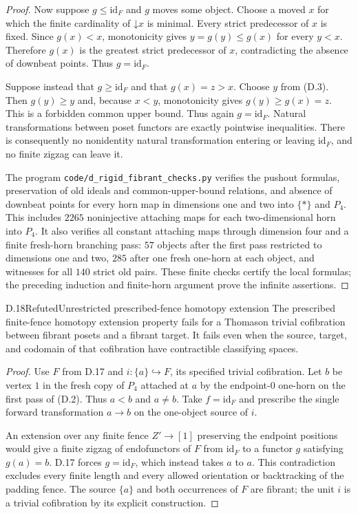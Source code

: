 \begin{proof}
Now suppose $g\le\mathrm{id}_F$ and $g$ moves some object. Choose a moved $x$ for which the finite cardinality of $\mathord\downarrow x$ is minimal. Every strict predecessor of $x$ is fixed. Since $g(x)<x$, monotonicity gives
$y=g(y)\le g(x)$ for every $y<x$. Therefore $g(x)$ is the greatest strict predecessor of $x$, contradicting the absence of downbeat points. Thus $g=\mathrm{id}_F$.

Suppose instead that $g\ge\mathrm{id}_F$ and that $g(x)=z>x$. Choose $y$ from (D.3). Then $g(y)\ge y$ and, because $x<y$, monotonicity gives $g(y)\ge g(x)=z$. This is a forbidden common upper bound. Thus again $g=\mathrm{id}_F$. Natural transformations between poset functors are exactly pointwise inequalities. There is consequently no nonidentity natural transformation entering or leaving $\mathrm{id}_F$, and no finite zigzag can leave it.

The program \texttt{code/d\_rigid\_fibrant\_checks.py} verifies the pushout formulas, preservation of old ideals and common-upper-bound relations, and absence of downbeat points for every horn map in dimensions one and two into $\{*\}$ and $P_4$. This includes $2265$ noninjective attaching maps for each two-dimensional horn into $P_4$. It also verifies all constant attaching maps through dimension four and a finite fresh-horn branching pass: $57$ objects after the first pass restricted to dimensions one and two, $285$ after one fresh one-horn at each object, and witnesses for all $140$ strict old pairs. These finite checks certify the local formulas; the preceding induction and finite-horn argument prove the infinite assertions.
\end{proof}

\begin{claim}{D.18}{Refuted}{Unrestricted prescribed-fence homotopy extension}
The prescribed finite-fence homotopy extension property fails for a Thomason trivial cofibration between fibrant posets and a fibrant target. It fails even when the source, target, and codomain of that cofibration have contractible classifying spaces.
\end{claim}
\begin{proof}
Use $F$ from D.17 and $i:\{a\}\hookrightarrow F$, its specified trivial cofibration. Let $b$ be vertex $1$ in the fresh copy of $P_4$ attached at $a$ by the endpoint-$0$ one-horn on the first pass of (D.2). Thus $a<b$ and $a\ne b$. Take $f=\mathrm{id}_F$ and prescribe the single forward transformation $a\to b$ on the one-object source of $i$.

An extension over any finite fence $Z'\to[1]$ preserving the endpoint positions would give a finite zigzag of endofunctors of $F$ from $\mathrm{id}_F$ to a functor $g$ satisfying $g(a)=b$. D.17 forces $g=\mathrm{id}_F$, which instead takes $a$ to $a$. This contradiction excludes every finite length and every allowed orientation or backtracking of the padding fence. The source $\{a\}$ and both occurrences of $F$ are fibrant; the unit $i$ is a trivial cofibration by its explicit construction.
\end{proof}

